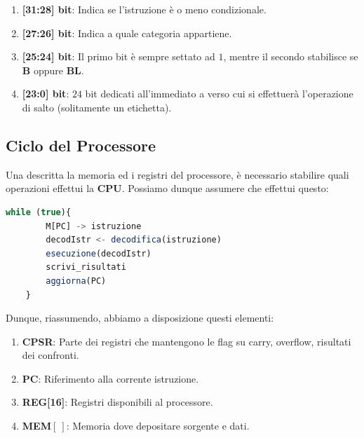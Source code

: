 \documentclass{article}
\begin{document}
\begin{enumerate}
    \begin{enumerate}
        \item \textbf{[31:28] bit}: Indica se l'istruzione è o meno condizionale.
        \vspace*{8px}
        \item \textbf{[27:26] bit}: Indica a quale categoria appartiene.
        \vspace*{8px}
        \item \textbf{[25:24] bit}: Il primo bit è sempre settato ad $1$, mentre il secondo stabilisce se \textbf{B} oppure \textbf{BL}.
        \vspace*{8px}
        \item \textbf{[23:0] bit}: $24$ bit dedicati all'immediato a verso cui si effettuerà l'operazione di salto (solitamente un etichetta).
    \end{enumerate}
    
\end{enumerate}

\newpage

\subsection{Ciclo del Processore}

Una descritta la memoria ed i registri del processore, è necessario stabilire quali operazioni effettui la \textbf{CPU}. Possiamo dunque assumere che effettui questo:

\begin{lstlisting}[language = JavaScript]
    while (true){
        M[PC] -> istruzione
        decodIstr <- decodifica(istruzione)
        esecuzione(decodIstr)
        scrivi_risultati
        aggiorna(PC)
    }
\end{lstlisting}
\vspace*{-20px}

Dunque, riassumendo, abbiamo a disposizione questi elementi:
\begin{enumerate}
    \item \textbf{CPSR}: Parte dei registri che mantengono le flag su carry, overflow, risultati dei confronti.
    \item \textbf{PC}: Riferimento alla corrente istruzione.
    \item \textbf{REG[16]}: Registri disponibili al processore.
    \item \textbf{MEM$[\:]$}: Memoria dove depositare sorgente e dati.
\end{enumerate}
\end{document}
